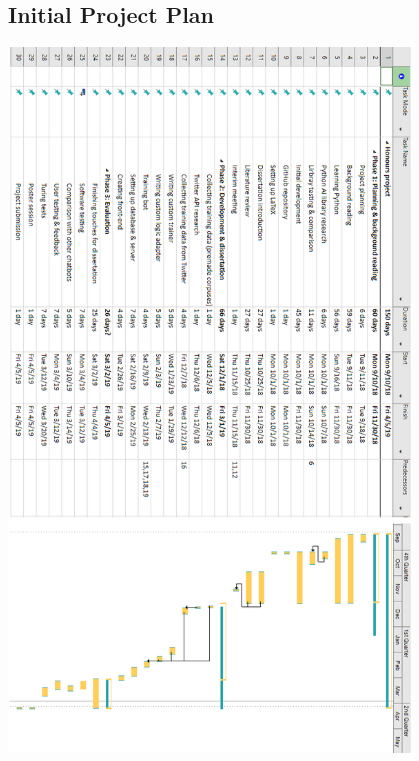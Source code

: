 \documentclass[12pt,a4paper]{article}
\begin{document}
\begin{appendices}
\section{Initial Project Plan}\label{app:gantt}
	\includegraphics[width=0.8\textwidth,height=0.8\textheight]{gantt.png}


\newpage

\end{appendices}
\end{document}
